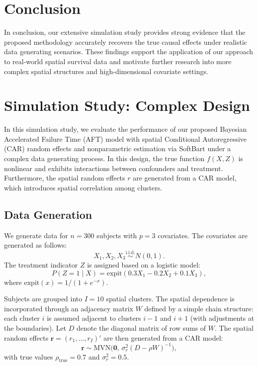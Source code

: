 \documentclass[useAMS,referee]{biom}
\begin{document}
\section{Conclusion}

In conclusion, our extensive simulation study provides strong evidence that the proposed methodology accurately recovers the true causal effects under realistic data generating scenarios. These findings support the application of our approach to real-world spatial survival data and motivate further research into more complex spatial structures and high-dimensional covariate settings.





\section{Simulation Study: Complex Design}

In this simulation study, we evaluate the performance of our proposed Bayesian Accelerated Failure Time (AFT) model with spatial Conditional Autoregressive (CAR) random effects and nonparametric estimation via SoftBart under a complex data generating process. In this design, the true function \( f(X,Z) \) is nonlinear and exhibits interactions between confounders and treatment. Furthermore, the spatial random effects \( r \) are generated from a CAR model, which introduces spatial correlation among clusters.

\subsection{Data Generation}

We generate data for \( n = 300 \) subjects with \( p = 3 \) covariates. The covariates are generated as follows:
\[
X_1, X_2, X_3 \stackrel{\text{i.i.d.}}{\sim} N(0,1).
\]
The treatment indicator \( Z \) is assigned based on a logistic model:
\[
P(Z=1 \mid X) = \text{expit}(0.3 X_1 - 0.2 X_2 + 0.1 X_3),
\]
where \(\text{expit}(x)=1/(1+e^{-x})\).

Subjects are grouped into \( I = 10 \) spatial clusters. The spatial dependence is incorporated through an adjacency matrix \( W \) defined by a simple chain structure: each cluster \( i \) is assumed adjacent to clusters \( i-1 \) and \( i+1 \) (with adjustments at the boundaries). Let \( D \) denote the diagonal matrix of row sums of \( W \). The spatial random effects \( \mathbf{r} = (r_1,\ldots, r_I)' \) are then generated from a CAR model:
\[
\mathbf{r} \sim \text{MVN}\Big( \mathbf{0},\, \sigma_r^2 (D - \rho W)^{-1}\Big),
\]
with true values \(\rho_{\text{true}}=0.7\) and \(\sigma_r^2=0.5\).
\end{document}

